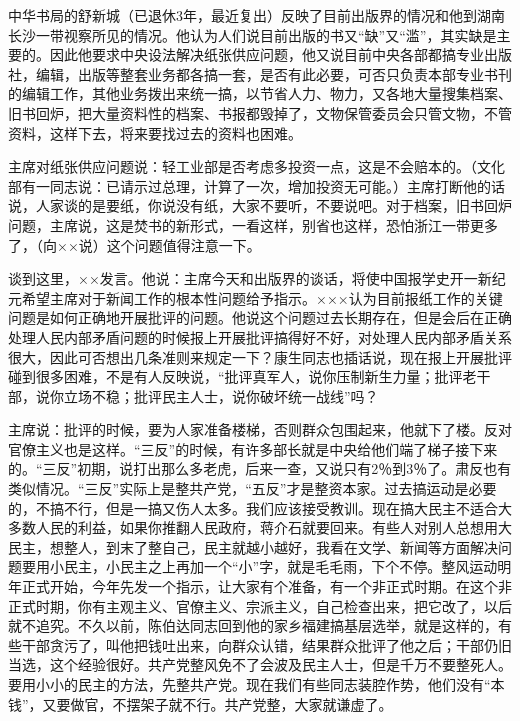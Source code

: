 中华书局的舒新城（已退休3年，最近复出）反映了目前出版界的情况和他到湖南长沙一带视察所见的情况。他认为人们说目前出版的书又“缺”又“滥”，其实缺是主要的。因此他要求中央设法解决纸张供应问题，他又说目前中央各部都搞专业出版社，编辑，出版等整套业务都各搞一套，是否有此必要，可否只负责本部专业书刊的编辑工作，其他业务拨出来统一搞，以节省人力、物力，又各地大量搜集档案、旧书回炉，把大量资料性的档案、书报都毁掉了，文物保管委员会只管文物，不管资料，这样下去，将来要找过去的资料也困难。

主席对纸张供应问题说：轻工业部是否考虑多投资一点，这是不会赔本的。（文化部有一同志说：已请示过总理，计算了一次，增加投资无可能。）主席打断他的话说，人家谈的是要纸，你说没有纸，大家不要听，不要说吧。对于档案，旧书回炉问题，主席说，这是焚书的新形式，一看这样，别省也这样，恐怕浙江一带更多了，（向××说）这个问题值得注意一下。

谈到这里，××发言。他说：主席今天和出版界的谈话，将使中国报学史开一新纪元希望主席对于新闻工作的根本性问题给予指示。×××认为目前报纸工作的关键问题是如何正确地开展批评的问题。他说这个问题过去长期存在，但是会后在正确处理人民内部矛盾问题的时候报上开展批评搞得好不好，对处理人民内部矛盾关系很大，因此可否想出几条准则来规定一下？康生同志也插话说，现在报上开展批评碰到很多困难，不是有人反映说，“批评真军人，说你压制新生力量；批评老干部，说你立场不稳；批评民主人士，说你破坏统一战线”吗？

主席说：批评的时候，要为人家准备楼梯，否则群众包围起来，他就下了楼。反对官僚主义也是这样。“三反”的时候，有许多部长就是中央给他们端了梯子接下来的。“三反”初期，说打出那么多老虎，后来一查，又说只有2％到3％了。肃反也有类似情况。“三反”实际上是整共产党，“五反”才是整资本家。过去搞运动是必要的，不搞不行，但是一搞又伤人太多。我们应该接受教训。现在搞大民主不适合大多数人民的利益，如果你推翻人民政府，蒋介石就要回来。有些人对别人总想用大民主，想整人，到末了整自己，民主就越小越好，我看在文学、新闻等方面解决问题要用小民主，小民主之上再加一个“小”字，就是毛毛雨，下个不停。整风运动明年正式开始，今年先发一个指示，让大家有个准备，有一个非正式时期。在这个非正式时期，你有主观主义、官僚主义、宗派主义，自己检查出来，把它改了，以后就不追究。不久以前，陈伯达同志回到他的家乡福建搞基层选举，就是这样的，有些干部贪污了，叫他把钱吐出来，向群众认错，结果群众批评了他之后；干部仍旧当选，这个经验很好。共产党整风免不了会波及民主人士，但是千万不要整死人。要用小小的民主的方法，先整共产党。现在我们有些同志装腔作势，他们没有“本钱”，又要做官，不摆架子就不行。共产党整，大家就谦虚了。

